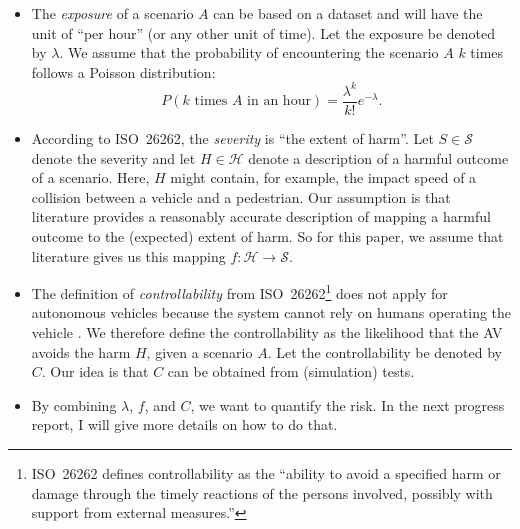 \documentclass[10pt,final,a4paper,oneside,onecolumn]{article}
\begin{document}
\begin{itemize}
	\begin{itemize}
		\item The \emph{exposure} of a scenario $A$ can be based on a dataset and will have the unit of ``per hour'' (or any other unit of time). Let the exposure be denoted by $\lambda$. We assume that the probability of encountering the scenario $A$ $k$ times follows a Poisson distribution:
		\begin{equation} \label{eq:exposure}
			P(k \text{ times }A\text{ in an hour}) = \frac{\lambda^k}{k!} e^{-\lambda}.
		\end{equation}
		\item According to ISO~26262, the \emph{severity} is ``the extent of harm''. Let $S \in \mathcal{S}$ denote the severity and let $H \in \mathcal{H}$ denote a description of a harmful outcome of a scenario. Here, $H$ might contain, for example, the impact speed of a collision between a vehicle and a pedestrian. Our assumption is that literature provides a reasonably accurate description of mapping a harmful outcome to the (expected) extent of harm. So for this paper, we assume that literature gives us this mapping $f:\mathcal{H} \rightarrow \mathcal{S}$.
		\item The definition of \emph{controllability} from ISO~26262\footnote{ISO~26262 defines controllability as the ``ability to avoid a specified harm or damage through the timely reactions of the persons involved, possibly with support from external measures.''} does not apply for autonomous vehicles because the system cannot rely on humans operating the vehicle \cite{monkhouse2015notion,khastgir2017towards}. We therefore define the controllability as the likelihood that the AV avoids the harm $H$, given a scenario $A$. Let the controllability be denoted by $C$. Our idea is that $C$ can be obtained from (simulation) tests.
		\item By combining $\lambda$, $f$, and $C$, we want to quantify the risk. In the next progress report, I will give more details on how to do that.
	\end{itemize}
\end{itemize}
\end{document}
